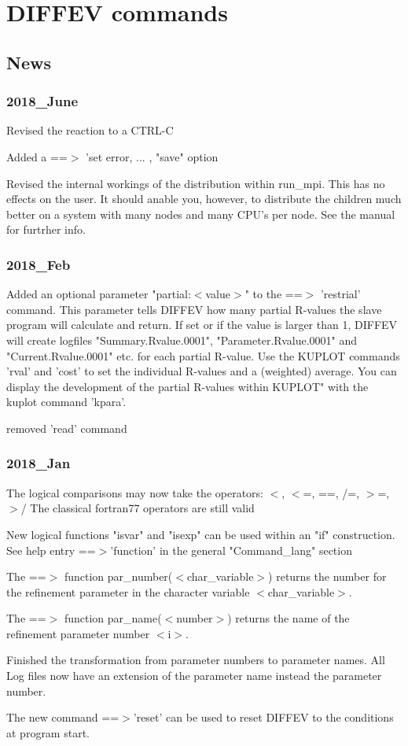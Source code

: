 \chapter{DIFFEV commands}
\section{News}
\subsection*{2018\_June}
\par
Revised the reaction to a CTRL-C 
\par
Added a ==$> $ 'set error, ... , "save" option 
\par
Revised the internal workings of the distribution within 
run\_mpi. This has no effects on the user. It should anable you, 
however, to distribute the children much better on a system with 
many nodes and many CPU's per node. See the manual for furtrher info. 
\subsection*{2018\_Feb}
\par
Added an optional parameter "partial:$ <$value$> $" to the 
==$> $ 'restrial' command. This parameter tells DIFFEV how many 
partial R-values the slave program will calculate and return. 
If set or if the value is larger than 1, DIFFEV will create 
logfiles "Summary.Rvalue.0001", "Parameter.Rvalue.0001" and 
"Current.Rvalue.0001" etc. for each partial R-value. 
Use the KUPLOT commands 'rval' and 'cost' to set the 
individual R-values and a (weighted) average. 
You can display the development of the partial R-values within 
KUPLOT" with the kuplot command 'kpara'. 
\par
removed 'read' command 
\subsection*{2018\_Jan}
\par
The logical comparisons may now take the operators: 
$ <$, $ <$=, ==, /=, $> $=, $> $/ 
The classical fortran77 operators are still valid 
\par
New logical functions "isvar" and "isexp" can be used within an 
"if" construction. See help entry ==$> $'function' in the 
general "Command\_lang" section 
\par
The ==$> $ function par\_number($ <$char\_variable$> $) returns the 
number for the refinement parameter in the character variable 
$ <$char\_variable$> $. 
\par
The ==$> $ function par\_name($ <$number$> $) returns the name of the 
refinement parameter number $ <$i$> $. 
\par
Finished the transformation from parameter numbers to 
parameter names. All Log files now have an extension of the 
parameter name instead the parameter number. 
\par
The new command ==$> $'reset' can be used to reset DIFFEV to the 
conditions at program start. 
